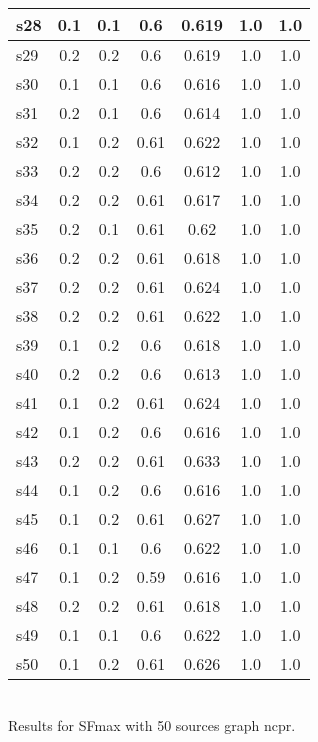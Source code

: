 \documentclass{article}
\begin{document}
\begin{tabular}{|l|c|c|c|c|c|c|}
\hline
s28 &0.1 & 0.1 & 0.6 & 0.619 & 1.0 & 1.0\\
\hline
s29 &0.2 & 0.2 & 0.6 & 0.619 & 1.0 & 1.0\\
\hline
s30 &0.1 & 0.1 & 0.6 & 0.616 & 1.0 & 1.0\\
\hline
s31 &0.2 & 0.1 & 0.6 & 0.614 & 1.0 & 1.0\\
\hline
s32 &0.1 & 0.2 & 0.61 & 0.622 & 1.0 & 1.0\\
\hline
s33 &0.2 & 0.2 & 0.6 & 0.612 & 1.0 & 1.0\\
\hline
s34 &0.2 & 0.2 & 0.61 & 0.617 & 1.0 & 1.0\\
\hline
s35 &0.2 & 0.1 & 0.61 & 0.62 & 1.0 & 1.0\\
\hline
s36 &0.2 & 0.2 & 0.61 & 0.618 & 1.0 & 1.0\\
\hline
s37 &0.2 & 0.2 & 0.61 & 0.624 & 1.0 & 1.0\\
\hline
s38 &0.2 & 0.2 & 0.61 & 0.622 & 1.0 & 1.0\\
\hline
s39 &0.1 & 0.2 & 0.6 & 0.618 & 1.0 & 1.0\\
\hline
s40 &0.2 & 0.2 & 0.6 & 0.613 & 1.0 & 1.0\\
\hline
s41 &0.1 & 0.2 & 0.61 & 0.624 & 1.0 & 1.0\\
\hline
s42 &0.1 & 0.2 & 0.6 & 0.616 & 1.0 & 1.0\\
\hline
s43 &0.2 & 0.2 & 0.61 & 0.633 & 1.0 & 1.0\\
\hline
s44 &0.1 & 0.2 & 0.6 & 0.616 & 1.0 & 1.0\\
\hline
s45 &0.1 & 0.2 & 0.61 & 0.627 & 1.0 & 1.0\\
\hline
s46 &0.1 & 0.1 & 0.6 & 0.622 & 1.0 & 1.0\\
\hline
s47 &0.1 & 0.2 & 0.59 & 0.616 & 1.0 & 1.0\\
\hline
s48 &0.2 & 0.2 & 0.61 & 0.618 & 1.0 & 1.0\\
\hline
s49 &0.1 & 0.1 & 0.6 & 0.622 & 1.0 & 1.0\\
\hline
s50 &0.1 & 0.2 & 0.61 & 0.626 & 1.0 & 1.0\\
\hline
\end{tabular}\\

\noindent Results for SFmax with 50 sources graph ncpr.
\end{document}
